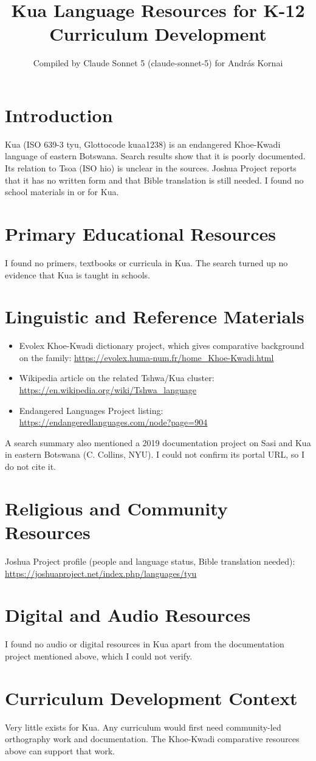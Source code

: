 \documentclass[12pt]{article}
\title{Kua Language Resources for K-12 Curriculum Development}
\author{Compiled by Claude Sonnet 5 (claude-sonnet-5) for Andr\'as Kornai}
\date{}
\begin{document}
\maketitle

\section{Introduction}
Kua (ISO 639-3 tyu, Glottocode kuaa1238) is an endangered Khoe-Kwadi language of eastern Botswana. Search results show that it is poorly documented. Its relation to Tsoa (ISO hio) is unclear in the sources. Joshua Project reports that it has no written form and that Bible translation is still needed. I found no school materials in or for Kua.

\section{Primary Educational Resources}
I found no primers, textbooks or curricula in Kua. The search turned up no evidence that Kua is taught in schools.

\section{Linguistic and Reference Materials}
\begin{itemize}
\item Evolex Khoe-Kwadi dictionary project, which gives comparative background on the family: \url{https://evolex.huma-num.fr/home_Khoe-Kwadi.html}
\item Wikipedia article on the related Tshwa/Kua cluster: \url{https://en.wikipedia.org/wiki/Tshwa_language}
\item Endangered Languages Project listing: \url{https://endangeredlanguages.com/node?page=904}
\end{itemize}
A search summary also mentioned a 2019 documentation project on Sasi and Kua in eastern Botswana (C. Collins, NYU). I could not confirm its portal URL, so I do not cite it.

\section{Religious and Community Resources}
Joshua Project profile (people and language status, Bible translation needed): \url{https://joshuaproject.net/index.php/languages/tyu}

\section{Digital and Audio Resources}
I found no audio or digital resources in Kua apart from the documentation project mentioned above, which I could not verify.

\section{Curriculum Development Context}
Very little exists for Kua. Any curriculum would first need community-led orthography work and documentation. The Khoe-Kwadi comparative resources above can support that work.
\end{document}
